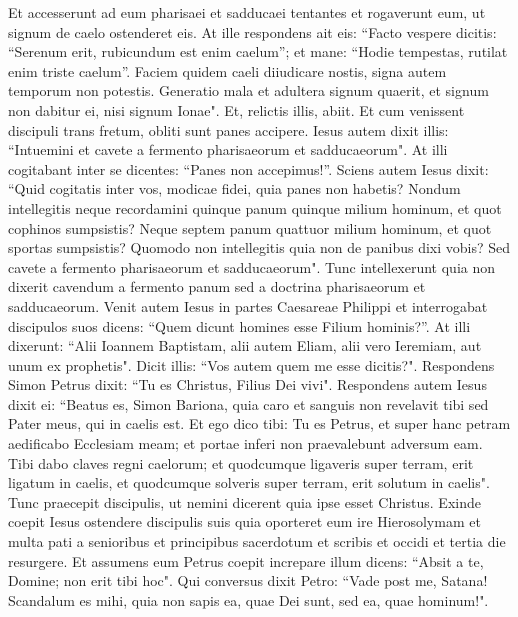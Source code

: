 \begin{biblechapter}  
\verse Et accesserunt ad eum pharisaei et sadducaei tentantes et rogaverunt eum, ut signum de caelo ostenderet eis. 
\verse At ille respondens ait eis: “Facto vespere dicitis: “Serenum erit, rubicundum est enim caelum”; 
\verse et mane: “Hodie tempestas, rutilat enim triste caelum”. Faciem quidem caeli diiudicare nostis, signa autem temporum non potestis. 
\verse Generatio mala et adultera signum quaerit, et signum non dabitur ei, nisi signum Ionae". Et, relictis illis, abiit. 
\verse Et cum venissent discipuli trans fretum, obliti sunt panes accipere. 
\verse Iesus autem dixit illis: “Intuemini et cavete a fermento pharisaeorum et sadducaeorum". 
\verse At illi cogitabant inter se dicentes: “Panes non accepimus!”. 
\verse Sciens autem Iesus dixit: “Quid cogitatis inter vos, modicae fidei, quia panes non habetis? 
\verse Nondum intellegitis neque recordamini quinque panum quinque milium hominum, et quot cophinos sumpsistis? 
\verse Neque septem panum quattuor milium hominum, et quot sportas sumpsistis? 
\verse Quomodo non intellegitis quia non de panibus dixi vobis? Sed cavete a fermento pharisaeorum et sadducaeorum". 
\verse Tunc intellexerunt quia non dixerit cavendum a fermento panum sed a doctrina pharisaeorum et sadducaeorum. 
\verse Venit autem Iesus in partes Caesareae Philippi et interrogabat discipulos suos dicens: “Quem dicunt homines esse Filium hominis?”. 
\verse At illi dixerunt: “Alii Ioannem Baptistam, alii autem Eliam, alii vero Ieremiam, aut unum ex prophetis". 
\verse Dicit illis: “Vos autem quem me esse dicitis?". 
\verse Respondens Simon Petrus dixit: “Tu es Christus, Filius Dei vivi".  
\verse Respondens autem Iesus dixit ei: “Beatus es, Simon Bariona, quia caro et sanguis non revelavit tibi sed Pater meus, qui in caelis est. 
\verse Et ego dico tibi: Tu es Petrus, et super hanc petram aedificabo Ecclesiam meam; et portae inferi non praevalebunt adversum eam. 
\verse Tibi dabo claves regni caelorum; et quodcumque ligaveris super terram, erit ligatum in caelis, et quodcumque solveris super terram, erit solutum in caelis". 
\verse Tunc praecepit discipulis, ut nemini dicerent quia ipse esset Christus. 
\verse Exinde coepit Iesus ostendere discipulis suis quia oporteret eum ire Hierosolymam et multa pati a senioribus et principibus sacerdotum et scribis et occidi et tertia die resurgere. 
\verse Et assumens eum Petrus coepit increpare illum dicens: “Absit a te, Domine; non erit tibi hoc". 
\verse Qui conversus dixit Petro: “Vade post me, Satana! Scandalum es mihi, quia non sapis ea, quae Dei sunt, sed ea, quae hominum!". 

\end{biblechapter}
